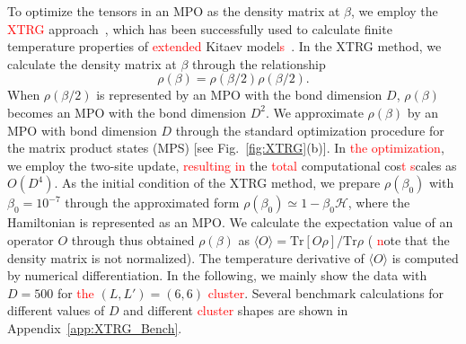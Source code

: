 \documentclass[twocolumn,superscriptaddress,showpacs, longbibliography, aps, prb]{revtex4-2}
\newcommand{\red}[1]{\textcolor{red}{#1}}
\begin{document}
To optimize the tensors in an MPO as the density matrix at $\beta$, 
we employ the %
\red{XTRG} %
approach~\red{\cite{Chen2018%
}}, which has been successfully used to calculate %
finite temperature properties of %
\red{extended} Kitaev model\red{s~\cite{Li2020, LiZWWGQLGL2021}}. In the XTRG method, 
we calculate the density matrix at $\beta$ through the relationship
\begin{equation}
 \rho(\beta)=\rho(\beta/2)\rho(\beta/2).
\end{equation}
When $\rho(\beta/2)$ is represented by an MPO with the bond dimension $D$, $\rho(\beta)$ becomes an MPO with the bond dimension $D^2$. We approximate $\rho(\beta)$ by an MPO with bond dimension $D$ through the standard optimization procedure for the matrix product states (MPS) \cite{Chen2018}  [see Fig.~\ref{fig:XTRG}(b)]. In %
\red{the optimization}, we employ the two-site update, %
\red{resulting in} the %
\red{total} computational cos\red{t %
s}cales as $O(D^4)$. As the initial condition of the XTRG %
method, we prepare $\rho(\beta_0)$ with $\beta_0 = 10^{-7}$ through the approximated form $\rho(\beta_0) \simeq 1 - \beta_0\mathcal{H}$, where the Hamiltonian is represented as an MPO. We calculate the expectation value of an operator ${O}$ through thus obtained $\rho(\beta)$ as $\langle {O} \rangle = \mathrm{Tr}%
[{O}\rho] /\mathrm{Tr}%
\rho$ (%
\red{n}ote that the density matrix is not normalized). 
The temperature derivative of $\langle {O} \rangle$ is computed %
by numerical differentiation.
In the following, we mainly show the data with $D=500$ for \red{the} $(L, L') = (6, 6)$ %
\red{cluster}. Several benchmark calculations for different values of $D$ and %
different %
\red{cluster} shapes %
are shown in Appendix~\ref{app:XTRG_Bench}. 
\end{document}
